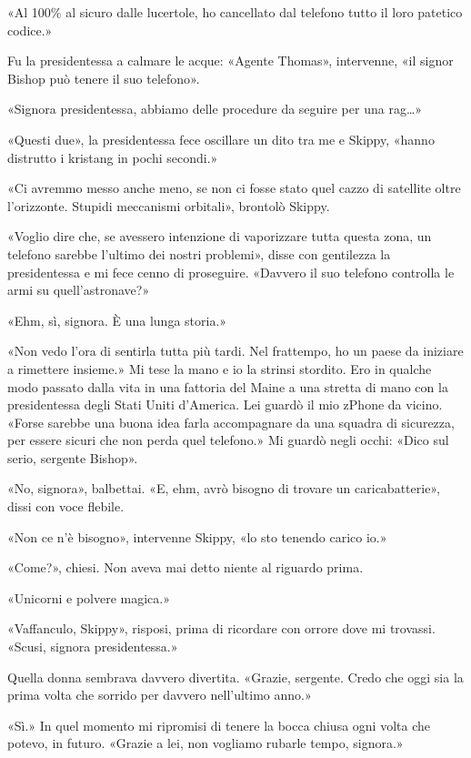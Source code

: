«Al 100\% al sicuro dalle lucertole, ho cancellato dal telefono tutto il
loro patetico codice.»

Fu la presidentessa a calmare le acque: «Agente Thomas», intervenne, «il
signor Bishop può tenere il suo telefono».

«Signora presidentessa, abbiamo delle procedure da seguire per una
rag\ldots»

«Questi due», la presidentessa fece oscillare un dito tra me e Skippy,
«hanno distrutto i kristang in pochi secondi.»

«Ci avremmo messo anche meno, se non ci fosse stato quel cazzo di
satellite oltre l'orizzonte. Stupidi meccanismi orbitali», brontolò
Skippy.

«Voglio dire che, se avessero intenzione di vaporizzare tutta questa
zona, un telefono sarebbe l'ultimo dei nostri problemi», disse con
gentilezza la presidentessa e mi fece cenno di proseguire. «Davvero il
suo telefono controlla le armi su quell'astronave?»

«Ehm, sì, signora. È una lunga storia.»

«Non vedo l'ora di sentirla tutta più tardi. Nel frattempo, ho un paese
da iniziare a rimettere insieme.» Mi tese la mano e io la strinsi
stordito. Ero in qualche modo passato dalla vita in una fattoria del
Maine a una stretta di mano con la presidentessa degli Stati Uniti
d'America. Lei guardò il mio zPhone da vicino. «Forse sarebbe una buona
idea farla accompagnare da una squadra di sicurezza, per essere sicuri
che non perda quel telefono.» Mi guardò negli occhi: «Dico sul serio,
sergente Bishop».

«No, signora», balbettai. «E, ehm, avrò bisogno di trovare un
caricabatterie», dissi con voce flebile.

«Non ce n'è bisogno», intervenne Skippy, «lo sto tenendo carico io.»

«Come?», chiesi. Non aveva mai detto niente al riguardo prima.

«Unicorni e polvere magica.»

«Vaffanculo, Skippy», risposi, prima di ricordare con orrore dove mi
trovassi. «Scusi, signora presidentessa.»

Quella donna sembrava davvero divertita. «Grazie, sergente. Credo che
oggi sia la prima volta che sorrido per davvero nell'ultimo anno.»

«Sì.» In quel momento mi ripromisi di tenere la bocca chiusa ogni volta
che potevo, in futuro. «Grazie a lei, non vogliamo rubarle tempo,
signora.»

